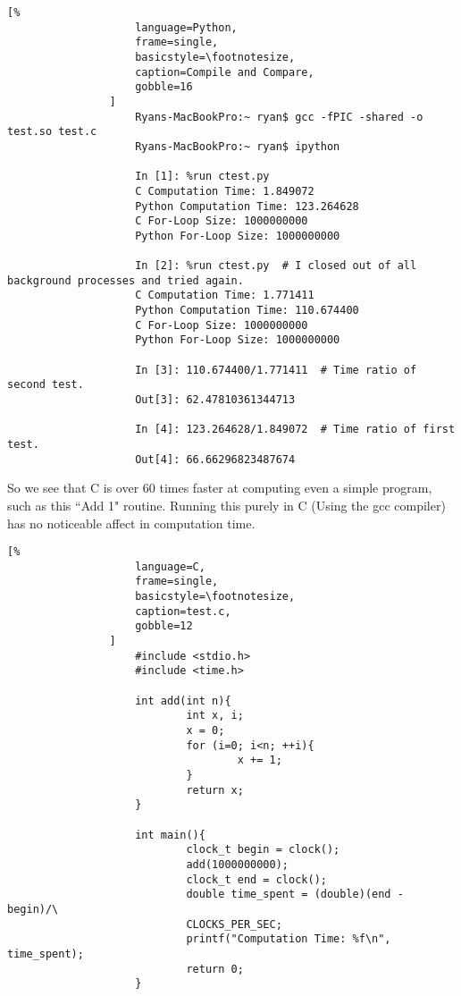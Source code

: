\documentclass[crop=false,class=book,oneside]{standalone}
\begin{document}
                \begin{lstlisting}[%
                    language=Python,
                    frame=single,
                    basicstyle=\footnotesize,
                    caption=Compile and Compare,
                    gobble=16
                ]
                    Ryans-MacBookPro:~ ryan$ gcc -fPIC -shared -o test.so test.c
                    Ryans-MacBookPro:~ ryan$ ipython
                    
                    In [1]: %run ctest.py
                    C Computation Time: 1.849072
                    Python Computation Time: 123.264628
                    C For-Loop Size: 1000000000
                    Python For-Loop Size: 1000000000
                    
                    In [2]: %run ctest.py  # I closed out of all background processes and tried again.
                    C Computation Time: 1.771411
                    Python Computation Time: 110.674400
                    C For-Loop Size: 1000000000
                    Python For-Loop Size: 1000000000
                    
                    In [3]: 110.674400/1.771411  # Time ratio of second test.
                    Out[3]: 62.47810361344713
                    
                    In [4]: 123.264628/1.849072  # Time ratio of first test.
                    Out[4]: 66.66296823487674
                \end{lstlisting}
                So we see that C is over 60 times faster at computing even a simple program, such as this ``Add 1" routine.
                Running this purely in C (Using the gcc compiler) has no
                noticeable affect in computation time.
                \begin{lstlisting}[%
                    language=C,
                    frame=single,
                    basicstyle=\footnotesize,
                    caption=test.c,
                    gobble=12
                ]
                    #include <stdio.h>
                    #include <time.h>
                    
                    int add(int n){
                            int x, i;
                            x = 0;
                            for (i=0; i<n; ++i){
                                    x += 1;
                            }
                            return x;
                    }
                    
                    int main(){
                            clock_t begin = clock();
                            add(1000000000);
                            clock_t end = clock();
                            double time_spent = (double)(end - begin)/\
                            CLOCKS_PER_SEC;
                            printf("Computation Time: %f\n", time_spent);
                            return 0;
                    }
                \end{lstlisting}
\end{document}
